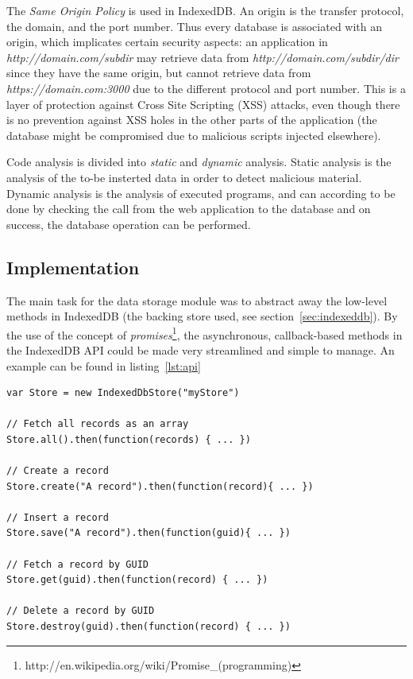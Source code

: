 The \emph{Same Origin Policy} is used in IndexedDB. An origin is the transfer protocol, the domain, and the port number. Thus every database is associated with an origin, which implicates certain security aspects: an application in \emph{http://domain.com/subdir} may retrieve data from \emph{http://domain.com/subdir/dir} since they have the same origin, but cannot retrieve data from \emph{https://domain.com:3000} due to the different protocol and port number. This is a layer of protection against Cross Site Scripting (XSS) attacks, even though there is no prevention against XSS holes in the other parts of the application (the database might be compromised due to malicious scripts injected elsewhere).

Code analysis is divided into \emph{static} and \emph{dynamic} analysis. Static analysis is the analysis of the to-be insterted data in order to detect malicious material. Dynamic analysis is the analysis of executed programs, and can according to \cite{IndexedDBSecurity:2012:Online} be done by checking the call from the web application to the database and on success, the database operation can be performed.

\subsection{Implementation}
The main task for the data storage module was to abstract away the low-level methods in IndexedDB (the backing store used, see section~\ref{sec:indexeddb}). By the use of the concept of \emph{promises}\footnote{http://en.wikipedia.org/wiki/Promise\_(programming)}, the asynchronous, callback-based methods in the IndexedDB API could be made very streamlined and simple to manage. An example can be found in listing~\ref{lst:api}

\begin{Code}
\begin{lstlisting}[caption={Common database operations}, label={lst:api}]
var Store = new IndexedDbStore("myStore")

// Fetch all records as an array
Store.all().then(function(records) { ... })

// Create a record
Store.create("A record").then(function(record){ ... })

// Insert a record
Store.save("A record").then(function(guid){ ... })

// Fetch a record by GUID
Store.get(guid).then(function(record) { ... })

// Delete a record by GUID
Store.destroy(guid).then(function(record) { ... })
\end{lstlisting}
\end{Code}

